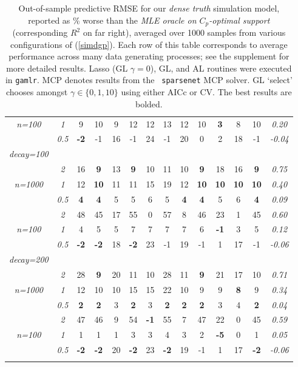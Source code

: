 \begin{table}
\begin{center}
\begin{tabular}{cc|cc|cc|cc|cc|cc|c|c}
\it n=100  & \it  1  & 9 & 10 & 9 & 12 & 12 & 13 & 12 & 10 & {\bf 3} & 8 & 10 & \it  0.20 \\
& \it  0.5  & {\bf -2} & -1 & 16 & -1 & 24 & -1 & 20 & 0 & 2 & 18 & -1 & \it  -0.04 \\[1ex]
\hline\rule{0pt}{3ex}{\it decay=100} &&&&&&&&&&&&\\
& \it  2  & 16 & {\bf 9} & 13 & {\bf 9} & 10 & 11 & 10 & {\bf 9} & 18 & 16 & {\bf 9} & \it  0.75 \\
\it n=1000  & \it  1  & 12 & {\bf 10} & 11 & 11 & 15 & 19 & 12 & {\bf 10} & {\bf 10} & {\bf 10} & {\bf 10} & \it  0.40 \\
& \it  0.5  & {\bf 4} & {\bf 4} & 5 & 5 & 6 & 5 & {\bf 4} & {\bf 4} & 5 & 6 & {\bf 4} & \it  0.09 \\[1ex]
\cline{2-2}\rule{0pt}{3ex}& \it  2  & 48 & 45 & 17 & 55 & 0 & 57 & 8 & 46 & 23 & 1 & 45 & \it  0.60 \\
\it n=100  & \it  1  & 4 & 5 & 5 & 7 & 7 & 7 & 7 & 6 & {\bf -1} & 3 & 5 & \it  0.12 \\
& \it  0.5  & {\bf -2} & {\bf -2} & 18 & {\bf -2} & 23 & -1 & 19 & -1 & 1 & 17 & -1 & \it  -0.06 \\[1ex]
\hline\rule{0pt}{3ex}{\it decay=200} &&&&&&&&&&&&\\
& \it  2  & 28 & {\bf 9} & 20 & 11 & 10 & 28 & 11 & {\bf 9} & 21 & 17 & 10 & \it  0.71 \\
\it n=1000  & \it  1  & 12 & 10 & 10 & 15 & 15 & 22 & 10 & 9 & 9 & {\bf 8} & 9 & \it  0.34 \\
& \it  0.5  & {\bf 2} & {\bf 2} & 3 & {\bf 2} & 3 & {\bf 2} & {\bf 2} & {\bf 2} & 3 & 4 & {\bf 2} & \it  0.04 \\[1ex]
\cline{2-2}\rule{0pt}{3ex}& \it  2  & 47 & 46 & 9 & 54 & {\bf -1} & 55 & 7 & 47 & 22 & 0 & 45 & \it  0.59 \\
\it n=100  & \it  1  & 1 & 1 & 1 & 3 & 3 & 4 & 3 & 2 & {\bf -5} & 0 & 1 & \it  0.05 \\
& \it  0.5  & {\bf -2} & {\bf -2} & 20 & {\bf -2} & 23 & {\bf -2} & 19 & -1 & 1 & 17 & {\bf -2} & \it  -0.06 \\[1ex]
\hline\rule{0pt}{3ex}\end{tabular}
\end{center}
\vspace{-1cm}
\caption{\label{tab:simdense} Out-of-sample predictive RMSE for our {\it dense truth} simulation model, 
reported as  \%
worse than the {\it MLE oracle on $C_p$-optimal support} (corresponding $R^2$ on far right), averaged over 1000  samples from
various configurations of (\ref{simdgp}).   
Each row of this table corresponds to average performance across many
data generating processes; see the supplement for more detailed results.  Lasso (GL $\gamma=0$), GL, and
AL routines were executed in {\tt gamlr}.  MCP denotes results from the {\tt
sparsenet} MCP solver. 
GL `select' chooses amongst $\gamma \in \{0,1,10\}$ using either AICc or CV.
The best results are bolded.}
\end{table}



